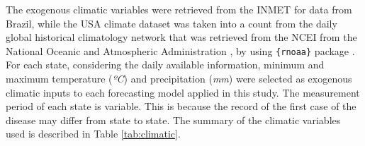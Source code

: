 \begin{table}[htb!]
\small
\centering
\caption{Summary of COVID-19 cases by country and state}
\label{tab:reports}
\end{table}

The exogenous climatic variables were retrieved from the \ac{INMET} \cite{brazil2020Instituto} for data from Brazil, while the \ac{USA} climate dataset was taken into a count from the daily global historical climatology network that was retrieved from the \ac{NCEI} from the National Oceanic and Atmospheric Administration \cite{u.s.2020National}, by using \texttt{\{rnoaa\}} package \cite{chamberlain2020Rnoaa}. For each state, considering the daily available information, minimum and maximum temperature (\textit{ºC}) and precipitation (\textit{mm}) were selected as exogenous climatic inputs to each forecasting model applied in this study. The measurement period of each state is variable. This is because the record of the first case of the disease may differ from state to state. The summary of the climatic variables used is described in Table \ref{tab:climatic}.  


